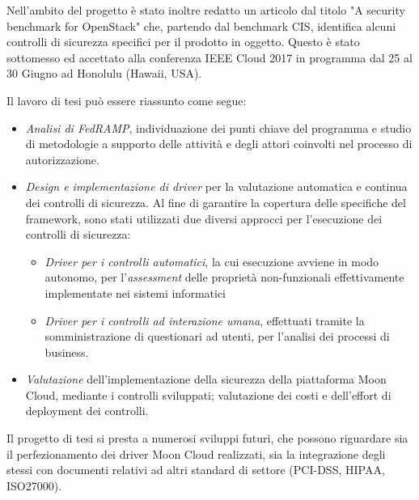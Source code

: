 \documentclass[10pt,a4paper]{article}
\begin{document}
Nell'ambito del progetto è stato inoltre redatto un articolo dal titolo "A security benchmark for OpenStack" che, partendo dal benchmark CIS, identifica alcuni controlli di sicurezza specifici per il prodotto in oggetto.
Questo è stato sottomesso ed accettato alla conferenza IEEE Cloud 2017 in programma dal 25 al 30 Giugno  ad Honolulu (Hawaii, USA).

Il lavoro di tesi può essere riassunto come segue:
\begin{itemize}
\item \textit{Analisi di FedRAMP}, individuazione dei punti chiave del programma e studio di metodologie a supporto delle attività e degli attori coinvolti nel processo di autorizzazione.
\item \textit{Design e implementazione di driver} per la valutazione automatica e continua dei controlli di sicurezza.
Al fine di garantire la copertura delle specifiche del framework, sono stati utilizzati due diversi approcci per l'esecuzione dei controlli di sicurezza:
\begin{itemize}
\item \textit{Driver per i controlli automatici}, la cui esecuzione avviene in modo autonomo, per l'\textit{assessment} delle proprietà non-funzionali effettivamente implementate nei sistemi informatici
\item \textit{Driver per i controlli ad interazione umana}, effettuati tramite la somministrazione di questionari ad utenti, per l'analisi dei processi di business.
\end{itemize}
\item \textit{Valutazione} dell'implementazione della sicurezza della piattaforma Moon Cloud, mediante i controlli sviluppati; valutazione dei costi e dell'effort di deployment dei controlli.
\end{itemize}

Il progetto di tesi si presta a numerosi sviluppi futuri, che possono riguardare sia il perfezionamento dei driver Moon Cloud realizzati, sia la integrazione degli stessi con documenti relativi ad altri standard di settore (PCI-DSS, HIPAA, ISO27000).
\end{document}
